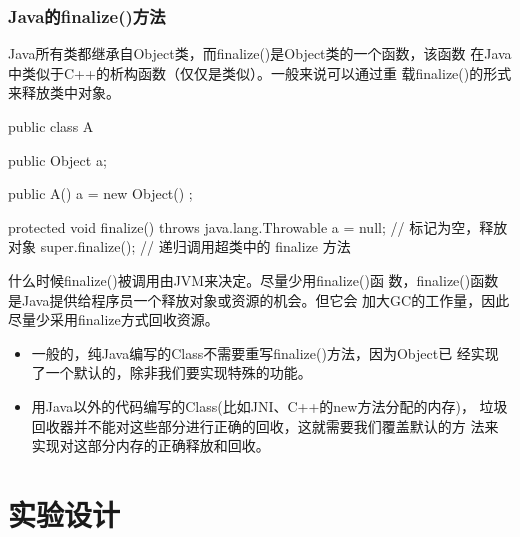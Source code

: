 \subsubsection{Java的finalize()方法}

Java所有类都继承自Object类，而finalize()是Object类的一个函数，该函数
在Java中类似于C++的析构函数（仅仅是类似）。一般来说可以通过重
载finalize()的形式来释放类中对象。

\begin{javaCode}
  public class A { 
    public Object a; 

    public A() { 
      a = new Object() ;
    } 
    
    protected void finalize() throws java.lang.Throwable { 
      a = null; // 标记为空，释放对象 
      super.finalize(); // 递归调用超类中的 finalize 方法
    }
  } 
\end{javaCode}

什么时候finalize()被调用由JVM来决定。{\hei\Blue 尽量少用finalize()函
  数，finalize()函数是Java提供给程序员一个释放对象或资源的机会。但它会
  加大GC的工作量，因此尽量少采用finalize方式回收资源。}

\begin{itemize}
\item 一般的，纯Java编写的Class不需要重写finalize()方法，因为Object已
  经实现了一个默认的，除非我们要实现特殊的功能。
\item 用Java以外的代码编写的Class(比如JNI、C++的new方法分配的内存)，
  垃圾回收器并不能对这些部分进行正确的回收，这就需要我们覆盖默认的方
  法来实现对这部分内存的正确释放和回收。
\end{itemize}

\newpage
\section*{实验设计}
\sline